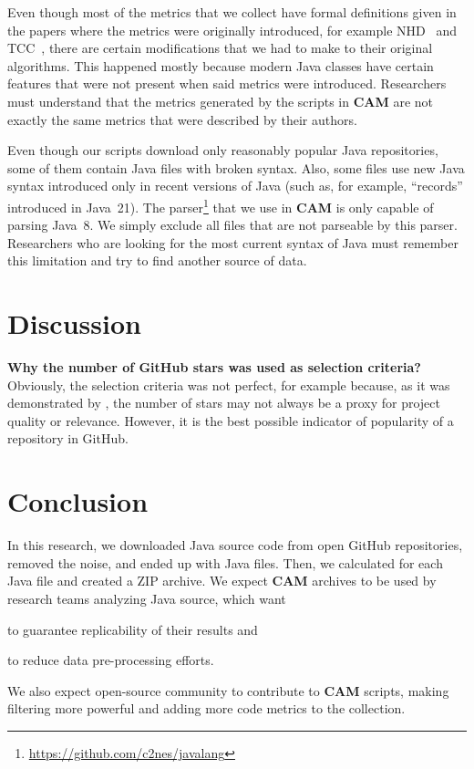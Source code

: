 \documentclass[sigplan,nonacm,review,anonymous]{acmart}
\newcommand\cam{{\sffamily\bfseries CAM}}
\begin{document}
Even though most of the metrics that we collect have formal definitions
given in the papers where the metrics were originally introduced,
for example NHD~\citep{counsell2006interpretation} and
TCC~\citep{bieman1995cohesion}, there are certain modifications
that we had to make to their original algorithms. This happened mostly
because modern Java classes have certain features that were not present
when said metrics were introduced. Researchers must understand that
the metrics generated by the scripts in \cam{} are not exactly the same
metrics that were described by their authors.

Even though our scripts download only reasonably popular Java repositories,
some of them contain Java files with broken syntax. Also, some files use
new Java syntax introduced only in recent versions of Java (such as,
for example, ``records'' introduced in Java~21).
The parser\footnote{\url{https://github.com/c2nes/javalang}} that we use
in \cam{} is only capable of parsing Java~8. We simply exclude all files
that are not parseable by this parser. Researchers who are looking for
the most current syntax of Java must remember this limitation and try
to find another source of data.

\section{Discussion}\label{sec:discussion}

\textbf{Why the number of GitHub stars was used as selection criteria?}
Obviously, the selection criteria was not perfect, for example because,
as it was demonstrated by \citet{munaiah2017curating}, the number of stars
may not always be a proxy for project quality or relevance. However,
it is the best possible indicator of popularity of a repository in GitHub.

\section{Conclusion}\label{sec:conclusion}

In this research, we downloaded Java source code from
\unskip{}
open GitHub repositories, removed the noise, and ended up with
\unskip{} Java files.
Then, we calculated
\unskip{}
for each Java file and created a ZIP archive.
We expect \cam{} archives to be used by research teams analyzing Java source, which want
\begin{inparaenum}[(a)]
\item to guarantee replicability of their results
and
\item to reduce data pre-processing efforts.
\end{inparaenum}
We also expect open-source community to contribute to \cam{} scripts,
making filtering more powerful and adding more code metrics to the collection.



\end{document}
